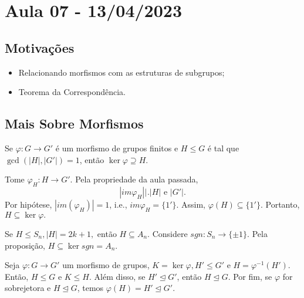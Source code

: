 \documentclass[Algebra/algebra_notes.tex]{subfiles}
\begin{document}
\section{Aula 07 - 13/04/2023}
\subsection{Motivações}
\begin{itemize}
	\item Relacionando morfismos com as estruturas de subgrupos;
	\item Teorema da Correspondência.
\end{itemize}

\subsection{Mais Sobre Morfismos}
\begin{prop*}
	Se $\varphi:G\rightarrow G'$ é um morfismo de grupos finitos e $H\leq{G}$ é tal que  $\gcd{(|H|, |G'|)} = 1$, então $\ker{\varphi}\supseteq{H}.$
\end{prop*}
\begin{proof*}
	Tome $\varphi_{H}:H\rightarrow G'$. Pela propriedade da aula passada,
	$$
		|im{\varphi_{H}}|\biggl|_{}^{}\biggr. |H|\text{ e } |G'|.
	$$
	Por hipótese, $|im(\varphi_{H})|=1$, i.e., $im \varphi_{H} = \{1'\}$. Assim, $\varphi(H)\subseteq{\{1'\}}.$
	Portanto, $H\subseteq{\ker{\varphi}}.$ \qedsymbol
\end{proof*}
\begin{example*}
	Se $H\leq{S_{n}}, |H| = 2k+1,$ então $H\subseteq{A_{n}}.$ Considere $sgn:S_{n}\rightarrow \{\pm1\}$. Pela proposição,
	$H\subseteq{\ker{sgn}}=A_{n}.$
\end{example*}
\begin{prop*}
	Seja $\varphi:G\rightarrow G'$ um morfismo de grupos, $K=\ker{\varphi}, H'\leq{G'}$ e $H = \varphi^{-1}(H').$ Então,
	$H\leq{G}$ e $K\leq{H}.$ Além disso, se $H'\trianglelefteq{G'}$, então $H\trianglelefteq{G}$. Por fim, se $\varphi$ for
	sobrejetora e $H\trianglelefteq{G}$, temos $\varphi(H) = H'\trianglelefteq{G'}.$
\end{prop*}
\end{document}

